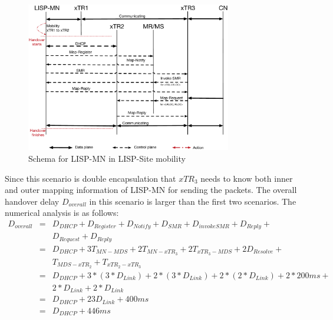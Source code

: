 {\begin{figure}[!th]
	\includegraphics[width=0.8\textwidth]{Pics/Mobility_double_encap_schema_SMR_askMDS_simplify}
	\caption{Schema for LISP-MN in LISP-Site mobility}
	\label{Mobility_double_encap_schema_SMR_askMDS_simplify}
\end{figure}

Since this scenario is double encapsulation that $xTR_3$ needs to know both inner and outer mapping information of LISP-MN for sending the packets. The overall handover delay $D_{overall}$ in this scenario is larger than the first two scenarios. The numerical analysis is as follows:
\begin{eqnarray}
D_{overall} &=& D_{DHCP} + D_{Register} + D_{Notify} + D_{SMR} + D_{invokeSMR} + D_{Reply} +  \nonumber \\
& & D_{Request}+ D_{Reply} \nonumber \\
&=& D_{DHCP} + 3T_{MN-MDS} + 2T_{MN-xTR_3} + 2T_{xTR_3-MDS} + 2D_{Resolve} +   \nonumber \\
& & T_{MDS-xTR_2} + T_{xTR_2-xTR_3}   \nonumber \\
&=& D_{DHCP} + 3* (3*D_{Link}) + 2*(3*D_{Link}) + 2*(2*D_{Link}) + 2*200ms +  \nonumber \\
& & 2*D_{Link} + 2*D_{Link} \nonumber \\
&=& D_{DHCP} + 23D_{Link} + 400 ms  \\
&=& D_{DHCP} + 446 ms \nonumber
\end{eqnarray}

}
